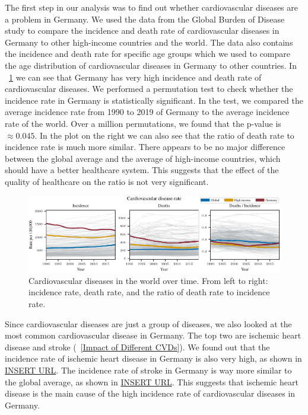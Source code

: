 The first step in our analysis was to find out whether cardiovascular diseases are a problem in Germany. We used the data from the Global Burden of Disease study \citep{GBD2019}
to compare the incidence and death rate of cardiovascular diseases in Germany to other high-income countries and the world. The data also contains 
the incidence and death rate for specific age groups which we used to compare the age distribution of cardiovascular diseases in Germany to other countries.
In \figurename~\ref{Cardiovascular diseases over time} we can see that Germany has very high incidence and death rate of cardiovascular diseases. We performed a
permutation test to check whether the incidence rate in Germany is statistically significant. In the test, we compared the average incidence rate from 1990 to 2019
of Germany to the average incidence rate of the world. Over a million permutations, we found that the p-value is $\approx 0.045$. 
In the plot on the right we can also see that the ratio of death rate to incidence rate is much more similar. There appears to be no major difference between the global average and the average of 
high-income countries, which should have a better healthcare system. This suggests that the effect of the quality of healthcare on the ratio is not very significant.

\begin{figure}[h]
    \vskip 0.2in
    \centering
    \centerline{\includegraphics[]{fig/fig_cardiovascular_disease_rate.pdf}}
    \caption{Cardiovascular diseases in the world over time. From left to right: incidence rate, death rate, 
    and the ratio of death rate to incidence rate.}
    \label{Cardiovascular diseases over time}
\end{figure}

Since cardiovascular diseases are just a group of diseases, we also looked at the most common cardiovascular disease in Germany. The top two are ischemic heart disease and 
stroke (\figurename~\ref{Impact of Different CVDs}). We found out that the incidence rate of ischemic heart disease in Germany is also very high, as shown in \url{INSERT URL}. The incidence rate of stroke in Germany
is way more similar to the global average, as shown in \url{INSERT URL}. This suggests that ischemic heart disease is the main cause of the high incidence rate of 
cardiovascular diseases in Germany.

